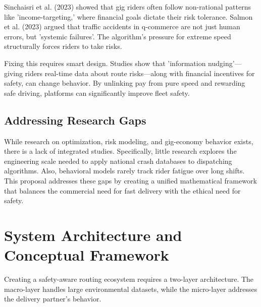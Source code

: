\documentclass[10pt,twocolumn,letterpaper]{article}
\begin{document}
Sinchaisri et al. (2023) showed that gig riders often follow non-rational patterns like 'income-targeting,' where financial goals dictate their risk tolerance. Salmon et al. (2023) argued that traffic accidents in q-commerce are not just human errors, but 'systemic failures'. The algorithm's pressure for extreme speed structurally forces riders to take risks.

Fixing this requires smart design. Studies show that 'information nudging'---giving riders real-time data about route risks---along with financial incentives for safety, can change behavior. By unlinking pay from pure speed and rewarding safe driving, platforms can significantly improve fleet safety.

\subsection{Addressing Research Gaps}

While research on optimization, risk modeling, and gig-economy behavior exists, there is a lack of integrated studies. Specifically, little research explores the engineering scale needed to apply national crash databases to dispatching algorithms. Also, behavioral models rarely track rider fatigue over long shifts. This proposal addresses these gaps by creating a unified mathematical framework that balances the commercial need for fast delivery with the ethical need for safety.

\section{System Architecture and Conceptual Framework}

Creating a safety-aware routing ecosystem requires a two-layer architecture. The macro-layer handles large environmental datasets, while the micro-layer addresses the delivery partner's behavior.
\end{document}

